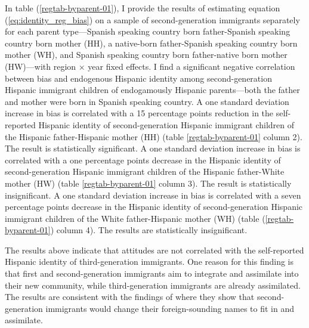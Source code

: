 \documentclass[12pt, fullpage]{article}
\begin{document}
In table (\ref{regtab-byparent-01}), I provide the results of estimating equation (\ref{eq:identity_reg_bias}) on a sample of second-generation immigrants separately for each parent type---Spanish speaking country born father-Spanish speaking country born mother (HH), a native-born father-Spanish speaking country born mother (WH), and Spanish speaking country born father-native born mother (HW)---with region $\times$ year fixed effects. I find a significant negative correlation between bias and endogenous Hispanic identity among second-generation Hispanic immigrant children of endogamously Hispanic parents---both the father and mother were born in Spanish speaking country. A one standard deviation increase in bias is correlated with a 15 percentage points reduction in the self-reported Hispanic identity of second-generation Hispanic immigrant children of the Hispanic father-Hispanic mother (HH) (table \ref{regtab-byparent-01} column 2). The result is statistically significant. A one standard deviation increase in bias is correlated with a one percentage points decrease in the Hispanic identity of second-generation Hispanic immigrant children of the Hispanic father-White mother (HW) (table \ref{regtab-byparent-01} column 3). The result is statistically insignificant. A one standard deviation increase in bias is correlated with a seven percentage points decrease in the Hispanic identity of second-generation Hispanic immigrant children of the White father-Hispanic mother (WH) (table (\ref{regtab-byparent-01}) column 4). The results are statistically insignificant.

The results above indicate that attitudes are not correlated with the self-reported Hispanic identity of third-generation immigrants. One reason for this finding is that first and second-generation immigrants aim to integrate and assimilate into their new community, while third-generation immigrants are already assimilated. The results are consistent with the findings of \citet{abramitzkyImmigrantsAssimilateMore2020a} where they show that second-generation immigrants would change their foreign-sounding names to fit in and assimilate. 
\end{document}
